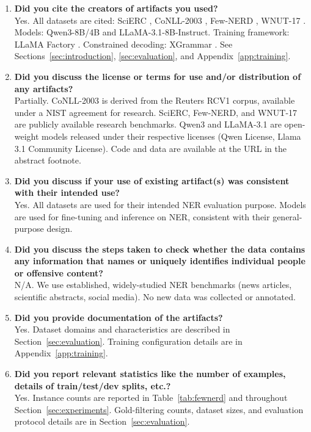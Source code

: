 \begin{enumerate}
\item[B1.] \textbf{Did you cite the creators of artifacts you used?}\\
Yes. All datasets are cited: SciERC \cite{luan2018scierc}, CoNLL-2003 \cite{tjongkimsang2003conll}, Few-NERD \cite{ding2021fewnerd}, WNUT-17 \cite{derczynski2017wnut}. Models: Qwen3-8B/4B and LLaMA-3.1-8B-Instruct. Training framework: LLaMA Factory \cite{zheng2024llamafactory}. Constrained decoding: XGrammar \cite{dong2024xgrammar}. See Sections~\ref{sec:introduction}, \ref{sec:evaluation}, and Appendix~\ref{app:training}.

\item[B2.] \textbf{Did you discuss the license or terms for use and/or distribution of any artifacts?}\\
Partially. CoNLL-2003 is derived from the Reuters RCV1 corpus, available under a NIST agreement for research. SciERC, Few-NERD, and WNUT-17 are publicly available research benchmarks. Qwen3 and LLaMA-3.1 are open-weight models released under their respective licenses (Qwen License, Llama 3.1 Community License). Code and data are available at the URL in the abstract footnote.

\item[B3.] \textbf{Did you discuss if your use of existing artifact(s) was consistent with their intended use?}\\
Yes. All datasets are used for their intended NER evaluation purpose. Models are used for fine-tuning and inference on NER, consistent with their general-purpose design.

\item[B4.] \textbf{Did you discuss the steps taken to check whether the data contains any information that names or uniquely identifies individual people or offensive content?}\\
N/A. We use established, widely-studied NER benchmarks (news articles, scientific abstracts, social media). No new data was collected or annotated.

\item[B5.] \textbf{Did you provide documentation of the artifacts?}\\
Yes. Dataset domains and characteristics are described in Section~\ref{sec:evaluation}. Training configuration details are in Appendix~\ref{app:training}.

\item[B6.] \textbf{Did you report relevant statistics like the number of examples, details of train/test/dev splits, etc.?}\\
Yes. Instance counts are reported in Table~\ref{tab:fewnerd} and throughout Section~\ref{sec:experiments}. Gold-filtering counts, dataset sizes, and evaluation protocol details are in Section~\ref{sec:evaluation}.
\end{enumerate}


